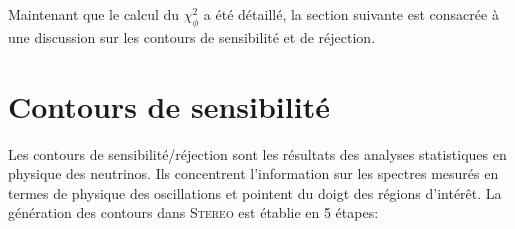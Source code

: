 \bigbreak

Maintenant que le calcul du $\chi^2_\phi$ a été détaillé, la section suivante est consacrée à une discussion sur les contours de sensibilité et de réjection.

\bigbreak


\section{Contours de sensibilité}

Les contours de sensibilité/réjection sont les résultats des analyses statistiques en physique des neutrinos. Ils concentrent l'information sur les spectres mesurés en termes de physique des oscillations et pointent du doigt des régions d'intérêt. La génération des contours dans \textsc{Stereo} est établie en 5 étapes:

